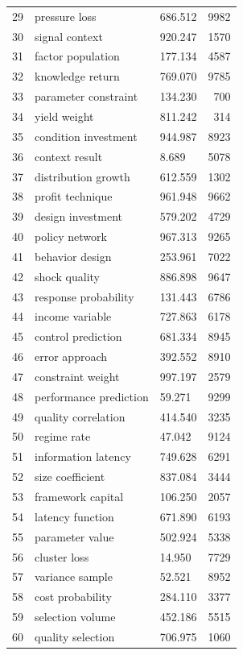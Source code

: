 \documentclass[11pt]{report}
\begin{document}
\begin{longtable}{rllr}
29 & pressure loss & 686.512 & 9982 \\
30 & signal context & 920.247 & 1570 \\
31 & factor population & 177.134 & 4587 \\
32 & knowledge return & 769.070 & 9785 \\
33 & parameter constraint & 134.230 & 700 \\
34 & yield weight & 811.242 & 314 \\
35 & condition investment & 944.987 & 8923 \\
36 & context result & 8.689 & 5078 \\
37 & distribution growth & 612.559 & 1302 \\
38 & profit technique & 961.948 & 9662 \\
39 & design investment & 579.202 & 4729 \\
40 & policy network & 967.313 & 9265 \\
41 & behavior design & 253.961 & 7022 \\
42 & shock quality & 886.898 & 9647 \\
43 & response probability & 131.443 & 6786 \\
44 & income variable & 727.863 & 6178 \\
45 & control prediction & 681.334 & 8945 \\
46 & error approach & 392.552 & 8910 \\
47 & constraint weight & 997.197 & 2579 \\
48 & performance prediction & 59.271 & 9299 \\
49 & quality correlation & 414.540 & 3235 \\
50 & regime rate & 47.042 & 9124 \\
51 & information latency & 749.628 & 6291 \\
52 & size coefficient & 837.084 & 3444 \\
53 & framework capital & 106.250 & 2057 \\
54 & latency function & 671.890 & 6193 \\
55 & parameter value & 502.924 & 5338 \\
56 & cluster loss & 14.950 & 7729 \\
57 & variance sample & 52.521 & 8952 \\
58 & cost probability & 284.110 & 3377 \\
59 & selection volume & 452.186 & 5515 \\
60 & quality selection & 706.975 & 1060 \\
\end{longtable}
\end{document}
